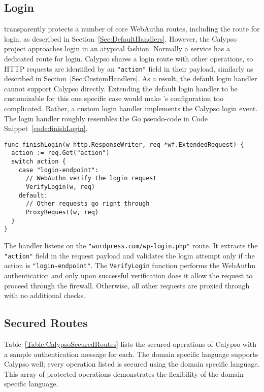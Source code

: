 \subsection{Login}\label{Sec:CalypsoLogin}

\sys{} transparently protects a number of core WebAuthn routes, including the route for login, as described in Section~\ref{Sec:DefaultHandlers}. However, the Calypso project approaches login in an atypical fashion. Normally a service has a dedicated route for login. Calypso shares a login route with other operations, so HTTP requests are identified by an \lstinline{"action"} field in their payload, similarly as described in Section~\ref{Sec:CustomHandlers}. As a result, the default login handler cannot support Calypso directly. Extending the default login handler to be customizable for this one specific case would make \sys{}'s configuration too complicated. Rather, a custom login handler implements the Calypso login event. The login handler roughly resembles the Go pseudo-code in Code Snippet~\ref{code:finishLogin}.

\begin{lstlisting}[float=h,label=code:finishLogin,caption=Go pseudo-code for the custom login handler for Calypso.]
func finishLogin(w http.ResponseWriter, req *wf.ExtendedRequest) {
  action := req.Get("action")
  switch action {
    case "login-endpoint":
      // WebAuthn verify the login request
      VerifyLogin(w, req)
    default:
      // Other requests go right through
      ProxyRequest(w, req)
  }
}
\end{lstlisting}

The handler listens on the \lstinline{"wordpress.com/wp-login.php"} route. It extracts the \lstinline{"action"} field in the request payload and validates the login attempt only if the action is \lstinline{"login-endpoint"}. The \lstinline{VerifyLogin} function performs the WebAuthn authentication and only upon successful verification does it allow the request to proceed through the firewall. Otherwise, all other requests are proxied through with no additional checks.

\subsection{Secured Routes}\label{Sec:CalypsoSecuredRoutes}

Table~\ref{Table:CalypsoSecuredRoutes} lists the secured operations of Calypso with a sample authentication message for each. The domain specific language supports Calypso well; every operation listed is secured using the domain specific language. This array of protected operations demonstrates the flexibility of the domain specific language.

